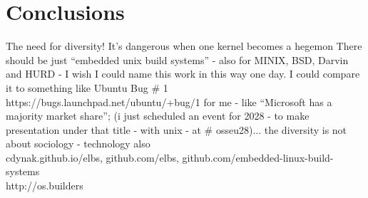 \documentclass[printmode]{mgr}
\begin{document}
\chapter{Conclusions}
\label{chapter:conclusions}

The need for diversity! It's dangerous when one kernel becomes a hegemon There should be just ``embedded unix build systems'' - also for MINIX, BSD, Darvin and HURD - I wish I could name this work in this way one day. I could compare it to something like Ubuntu Bug \# 1 https://bugs.launchpad.net/ubuntu/+bug/1 for me - like ``Microsoft has a majority market share''; (i just scheduled an event for 2028 - to make presentation under that title - with unix - at \# osseu28)... the diversity is not about sociology - technology also
\\
cdynak.github.io/elbs, github.com/elbs, github.com/embedded-linux-build-systems
\\
http://os.builders







%
%
%
%



\listoffigures
\listoftables
\end{document}
